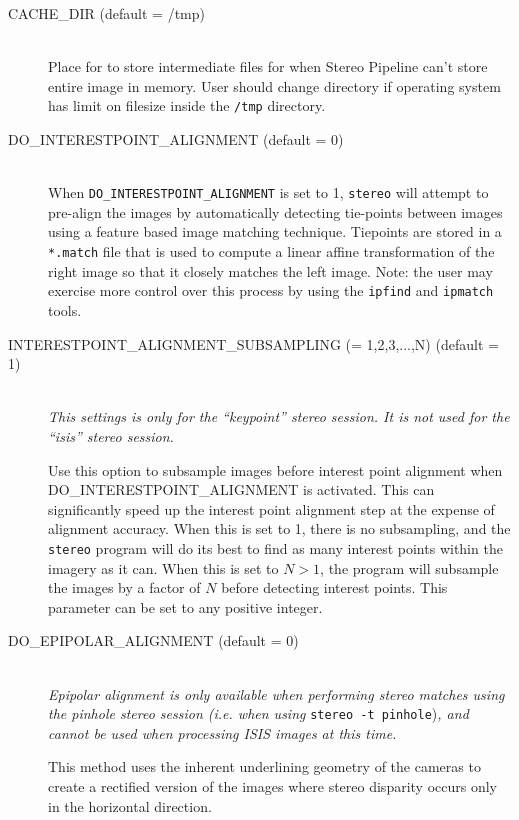 \begin{description}
\item[CACHE\_DIR \textnormal (default = /tmp)] \hfill \\
  Place for to store intermediate files for when Stereo Pipeline can't
  store entire image in memory. User should change directory if
  operating system has limit on filesize inside the \texttt{/tmp}
  directory.

\item[DO\_INTERESTPOINT\_ALIGNMENT \textnormal (default = 0)] \hfill \\
  When \texttt{DO\_INTERESTPOINT\_ALIGNMENT} is set to 1,
  \texttt{stereo} will attempt to pre-align the images by
  automatically detecting tie-points between images using a feature
  based image matching technique. Tiepoints are stored in a
  \texttt{*.match} file that is used to compute a linear affine
  transformation of the right image so that it closely matches the
  left image.  Note: the user may exercise more control over this
  process by using the \texttt{ipfind} and \texttt{ipmatch} tools.

\item[INTERESTPOINT\_ALIGNMENT\_SUBSAMPLING \textnormal{\small{(= 1,2,3,...,N)}} (default = 1)]\hfill \\
  {\em This settings is only for the ``keypoint'' stereo session.  It
    is not used for the ``isis'' stereo session.}

  Use this option to subsample images before interest point alignment
  when \\ DO\_INTERESTPOINT\_ALIGNMENT is activated.  This can
  significantly speed up the interest point alignment step at the
  expense of alignment accuracy.  When this is set to 1, there is no
  subsampling, and the \texttt{stereo} program will do its best to
  find as many interest points within the imagery as it can.  When
  this is set to $N > 1$, the program will subsample the images by a
  factor of $N$ before detecting interest points.  This parameter can
  be set to any positive integer.

\item[DO\_EPIPOLAR\_ALIGNMENT \textnormal (default = 0)] \hfill \\
  {\em Epipolar alignment is only available when performing stereo
    matches using the pinhole stereo session (i.e. when using}
    \texttt{stereo -t pinhole}){\em, and cannot be used when processing
    ISIS images at this time.}

  This method uses the inherent underlining geometry of the cameras to
  create a rectified version of the images where stereo disparity
  occurs only in the horizontal direction.


\end{description}
